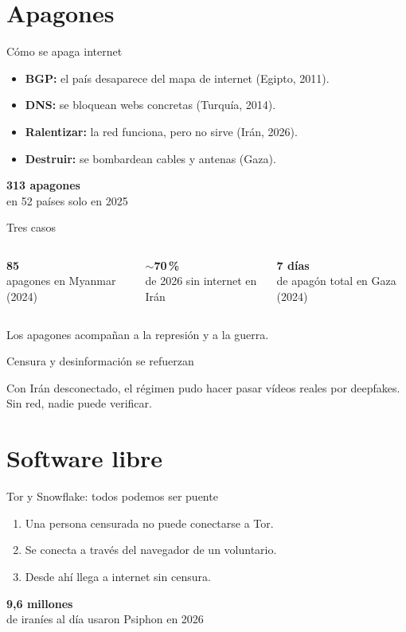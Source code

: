 \documentclass[aspectratio=169,12pt]{beamer}
\newcommand{\cifra}[2]{%
  \begin{center}
    {\color{terra}\fontsize{36}{40}\selectfont\bfseries #1}\\[0.2cm]
    {\large #2}
  \end{center}}
\begin{document}
\section{Apagones}
\begin{frame}{Cómo se apaga internet}
  \begin{itemize}
    \item \textbf{BGP:} el país desaparece del mapa de internet (Egipto, 2011).
    \item \textbf{DNS:} se bloquean webs concretas (Turquía, 2014).
    \item \textbf{Ralentizar:} la red funciona, pero no sirve (Irán, 2026).
    \item \textbf{Destruir:} se bombardean cables y antenas (Gaza).
  \end{itemize}
  \cifra{313 apagones}{en 52 países solo en 2025}
\end{frame}

\begin{frame}{Tres casos}
  \begin{columns}[T]
      \cifra{85}{apagones en Myanmar (2024)}
      \cifra{$\sim$70\,\%}{de 2026 sin internet en Irán}
      \cifra{7 días}{de apagón total en Gaza (2024)}
  \end{columns}
  \vspace{0.4cm}
  \begin{center}
    Los apagones acompañan a la represión y a la guerra.
  \end{center}
\end{frame}

\begin{frame}{Censura y desinformación se refuerzan}
  \vspace{0.5cm}
  \begin{center}
    {\Large Con Irán desconectado, el régimen pudo hacer pasar vídeos reales por deepfakes.}\\[1cm]
    \alert{\Large Sin red, nadie puede verificar.}
  \end{center}
\end{frame}

\section{Software libre}
\begin{frame}{Tor y Snowflake: todos podemos ser puente}
  \begin{enumerate}
    \item Una persona censurada no puede conectarse a Tor.
    \item Se conecta a través del navegador de un voluntario.
    \item Desde ahí llega a internet sin censura.
  \end{enumerate}
  \cifra{9,6 millones}{de iraníes al día usaron Psiphon en 2026}
\end{frame}
\end{document}
